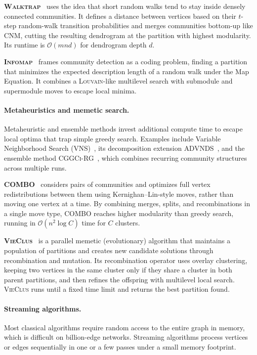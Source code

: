 \documentclass[11pt,a4paper]{article}
\begin{document}
\textbf{\textsc{Walktrap}}~\cite{walktrap2005} uses the idea that short random walks tend to stay inside densely connected communities. It defines a distance between vertices based on their $t$-step random-walk transition probabilities and merges communities bottom-up like \textsc{CNM}, cutting the resulting dendrogram at the partition with highest modularity. Its runtime is $\mathcal{O}(m n d)$ for dendrogram depth $d$.

\textbf{\textsc{Infomap}}~\cite{infomap2008} frames community detection as a coding problem, finding a partition that minimizes the expected description length of a random walk under the Map Equation. It combines a \textsc{Louvain}-like multilevel search with submodule and supermodule moves to escape local minima.

\paragraph*{\textbf{Metaheuristics and memetic search.}}
Metaheuristic and ensemble methods invest additional compute time to escape local optima that trap simple greedy search. Examples include Variable Neighborhood Search (\textsc{VNS})~\cite{vns2012}, its decomposition extension \textsc{ADVNDS}~\cite{advnds2019}, and the ensemble method \textsc{CGGCi-RG}~\cite{cggci_rg2012}, which combines recurring community structures across multiple runs.

\textbf{\textsc{COMBO}}~\cite{combo2014} considers pairs of communities and optimizes full vertex redistributions between them using Kernighan--Lin-style moves, rather than moving one vertex at a time. By combining merges, splits, and recombinations in a single move type, \textsc{COMBO} reaches higher modularity than greedy search, running in $\mathcal{O}(n^2 \log C)$ time for $C$ clusters.

\textbf{\textsc{VieClus}}~\cite{vieclus2018} is a parallel memetic (evolutionary) algorithm that maintains a population of partitions and creates new candidate solutions through recombination and mutation. Its recombination operator uses overlay clustering, keeping two vertices in the same cluster only if they share a cluster in both parent partitions, and then refines the offspring with multilevel local search. \textsc{VieClus} runs until a fixed time limit and returns the best partition found.

\paragraph*{\textbf{Streaming algorithms.}}
Most classical algorithms require random access to the entire graph in memory, which is difficult on billion-edge networks. Streaming algorithms process vertices or edges sequentially in one or a few passes under a small memory footprint.
\end{document}
